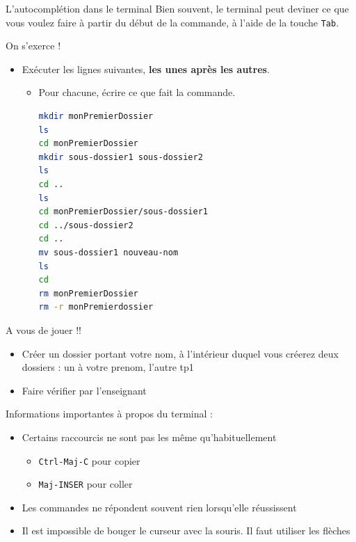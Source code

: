 \begin{UPSTIinfor}{L'autocomplétion dans le terminal}
	Bien souvent, le terminal peut deviner ce que vous voulez faire à partir du début de la commande, à l'aide de la touche \texttt{Tab}.
\end{UPSTIinfor}

\begin{UPSTIManipulation}{On s'exerce !}
	\begin{itemize}
		\item[$\Box$] Exécuter les lignes suivantes, \textbf{les unes après les autres}.
		      \begin{itemize}
			      \item[$\Box$] Pour chacune, écrire ce que fait la commande.
			            \begin{lstlisting}[language=bash,style=console]
mkdir monPremierDossier
ls
cd monPremierDossier
mkdir sous-dossier1 sous-dossier2
ls
cd ..
ls
cd monPremierDossier/sous-dossier1
cd ../sous-dossier2
cd ..
mv sous-dossier1 nouveau-nom
ls
cd
rm monPremierDossier
rm -r monPremierdossier
\end{lstlisting}
		      \end{itemize}
	\end{itemize}
	A vous de jouer !!
	\begin{itemize}
		\item[$\Box$] Créer un dossier portant votre nom, à l'intérieur duquel vous créerez deux dossiers : un à votre prenom, l'autre tp1
		\item[$\Box$] Faire vérifier par l'enseignant
	\end{itemize}
\end{UPSTIManipulation}

\begin{UPSTIwarning}{Informations importantes à propos du terminal :}
	\begin{itemize}
		\item Certains raccourcis ne sont pas les même qu'habituellement
		      \begin{itemize}
			      \item \texttt{Ctrl-Maj-C} pour copier
			      \item \texttt{Maj-INSER} pour coller
		      \end{itemize}
		\item Les commandes ne répondent souvent rien lorsqu'elle réussissent
		\item Il est impossible de bouger le curseur avec la souris. Il faut utiliser les flèches
	\end{itemize}
\end{UPSTIwarning}

